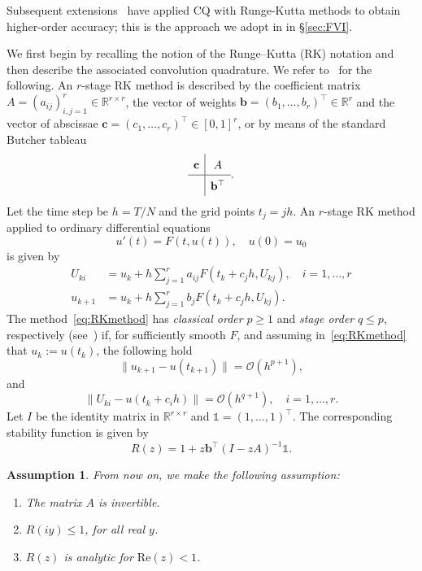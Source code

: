 \documentclass[a4paper,10pt,reqno]{amsart}
\newtheorem{assumption}{Assumption}[section]
\theoremstyle{definition}
\newcommand{\R}{\mathbb{R}}      %
\begin{document}
Subsequent extensions~\cite{LuOs, BaLu,BaLo} have applied CQ with Runge-Kutta methods to obtain higher-order accuracy; this is the approach we adopt in in \S\ref{sec:FVI}. 

We first begin by recalling the notion of the Runge–Kutta (RK) notation and then describe the associated convolution quadrature. We refer to~\cite{HaWa,Raff2023} for the following.  An $r$-stage RK method is described by the coefficient matrix $A=(a_{ij})_{i,j=1}^r\in\R^{r\times r}$, the vector of weights $\mathbf{b}=(b_1,\ldots,b_r)^\top\in\R^r$ and the vector of abscissae $\mathbf{c}=(c_1,\ldots,c_r)^\top\in[0,1]^r$, or by means of the standard Butcher tableau
$$\setlength{\tabcolsep}{20pt}
\renewcommand{\arraystretch}{1.5}\begin{array}{c|c}
\mathbf{c}   &  A  \\ \hline
     &  \mathbf{b} ^\top 
\end{array}.$$
Let the time step be $h = T /N$ and the grid points $t_j = jh$. An $r$-stage RK method applied to ordinary differential equations
\[u'(t)=F(t,u(t)),\quad u(0)=u_0\]
is given by 
\begin{subequations}\label{eq:RKmethod}
\begin{align}
U_{ki}&= u_k +h\sum_{j=1}^r a_{ij}F(t_k+c_jh,U_{kj}),\quad i=1,\ldots,r\\
u_{k+1}&= u_k +h\sum_{j=1}^r b_{j}F(t_k+c_jh,U_{kj}).
\end{align}
\end{subequations}
The method~\eqref{eq:RKmethod} has \textit{classical order} $p\geq 1$ and \textit{stage order} $q \leq p$, respectively (see~\cite{HaWa}) if, for sufficiently smooth $F$, and assuming in~\eqref{eq:RKmethod} that  $u_k:=u(t_k)$, the following hold
\[\big\|u_{k+1}-u(t_{k+1})\big\|=\mathcal{O}(h^{p+1}),
\]
and 
\[\big\|U_{ki}-u({t_k+c_ih})\big\|=\mathcal{O}(h^{q+1}),\quad i=1,\ldots,r.\]
Let $I$ be the identity matrix in $\R^{r\times r}$ and $\mathds{1}=(1,\ldots,1)^\top$. The corresponding stability function is given by
\begin{equation}\label{StabFunc}
R(z)=1+z \mathbf{b} ^\top (I-z  A )^{-1}\mathds{1}.
\end{equation}

\begin{assumption}\label{assumption}
From now on, we make the following assumption:
\begin{enumerate}[leftmargin=2.5em]
\item The matrix $A$ is invertible.
\item  $R(iy)\leq 1$, for all real $y$.
\item $R(z)$ is analytic for $\mathrm{Re}(z)<1$.
\end{enumerate}
\end{assumption}
\end{document}
